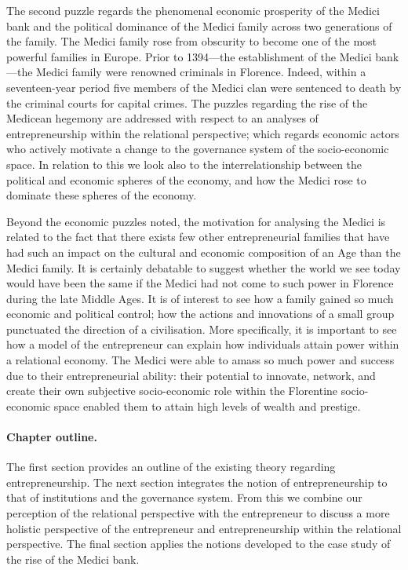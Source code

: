 The second puzzle regards the phenomenal economic prosperity of the Medici bank and the political dominance of the Medici family across two generations of the family. The Medici family rose from obscurity to become one of the most powerful families in Europe. Prior to 1394---the establishment of the Medici bank---the Medici family were renowned criminals in Florence. Indeed, within a seventeen-year period five members of the Medici clan were sentenced to death by the criminal courts for capital crimes. The puzzles regarding the rise of the Medicean hegemony are addressed with respect to an analyses of entrepreneurship within the relational perspective; which regards economic actors who actively motivate a change to the governance system of the socio-economic space. In relation to this we look also to the interrelationship between the political and economic spheres of the economy, and how the Medici rose to dominate these spheres of the economy.

Beyond the economic puzzles noted, the motivation for analysing the Medici is related to the fact that there exists few other entrepreneurial families that have had such an impact on the cultural and economic composition of an Age than the Medici family. It is certainly debatable to suggest whether the world we see today would have been the same if the Medici had not come to such power in Florence during the late Middle Ages. It is of interest to see how a family gained so much economic and political control; how the actions and innovations of a small group punctuated the direction of a civilisation. More specifically, it is important to see how a model of the entrepreneur can explain how individuals attain power within a relational economy. The Medici were able to amass so much power and success due to their entrepreneurial ability: their potential to innovate, network, and create their own subjective socio-economic role within the Florentine socio-economic space enabled them to attain high levels of wealth and prestige.

\paragraph{Chapter outline.}

The first section provides an outline of the existing theory regarding entrepreneurship. The next section integrates the notion of entrepreneurship to that of institutions and the governance system. From this we combine our perception of the relational perspective with the entrepreneur to discuss a more holistic perspective of the entrepreneur and entrepreneurship within the relational perspective. The final section applies the notions developed to the case study of the rise of the Medici bank.


